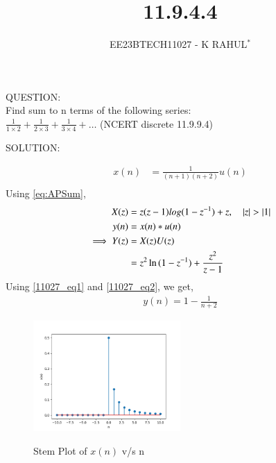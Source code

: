 \documentclass[journal,12pt,twocolumn]{IEEEtran}
\theoremstyle{remark}
\begin{document}

\vspace{3cm}
\title{11.9.4.4}
\author{EE23BTECH11027 - K RAHUL$^{*}$%
}
\maketitle
\newpage
\bigskip
\renewcommand{\thefigure}{\theenumi}
\renewcommand{\thetable}{\theenumi}
QUESTION:\\
Find sum to n terms of the following series:\\
$\frac{1}{1 \times 2} + \frac{1}{2 \times 3} + \frac{1}{3 \times 4} + \ldots$ \hfill(NCERT discrete 11.9.9.4)
\bigskip \bigskip


SOLUTION:
\begin{table}[ht]

\end{table}
\begin{align}
x(n) &= \frac{1}{(n+1)(n+2)}u(n)\\
\end{align}
Using \eqref{eq:APSum},
\begin{align}
X(z) &= z(z-1)log(1-z^{-1}) + z,
\quad \left\vert z\right\vert > \left\vert1\right\vert\\
y(n) &= x(n) * u(n)\\
\implies Y(z) &= X(z)U(z)\\
&= z^2\ln{(1-z^{-1})} + \frac{z^2}{z-1}\end{align}
\bigskip
Using \eqref{11027_eq1} and \eqref{11027_eq2}, we get,
\begin{align}
y(n) = 1- \frac{1}{n+2} 
\end{align}
\begin{figure}[h]
    \includegraphics[width=0.5\textwidth]{figs/x(n)_plot.png}\label{fig:stem-plot}
    \caption{Stem Plot of $x(n)$ v/s n}
\end{figure}
\end{document}
